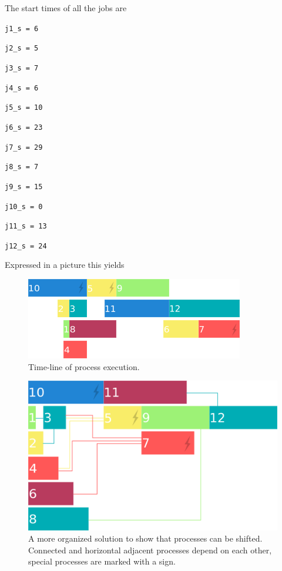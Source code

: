\documentclass[a4paper]{article}
\begin{document}
The start times of all the jobs are 

{\tt j1\_s = 6 }

{\tt j2\_s = 5 }

{\tt j3\_s = 7 }

{\tt j4\_s = 6 }

{\tt j5\_s = 10 }

{\tt j6\_s = 23 }

{\tt j7\_s = 29 }

{\tt j8\_s = 7 }

{\tt j9\_s = 15 }

{\tt j10\_s = 0 }

{\tt j11\_s = 13 }

{\tt j12\_s = 24 }

Expressed in a picture this yields

\begin{figure}[H]
	\centering
	\includegraphics[scale=1]{timeline-2.png}
	\caption{Time-line of process execution.}
\end{figure}

\begin{figure}[H]
		\centering
			\includegraphics[scale=0.7]{timeline.png}
		\caption{A more organized solution to show that processes can be shifted. Connected and horizontal adjacent processes depend on each other, special processes are marked with a sign.}
\end{figure}
\end{document}
